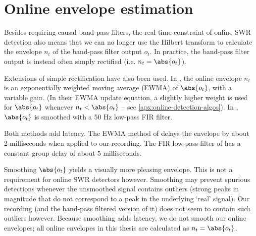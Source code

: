 



\section{Online envelope estimation}

Besides requiring causal band-pass filters, the real-time constraint of online SWR detection also means that we can no longer use the Hilbert transform to calculate the envelope $n_t$ of the band-pass filter output $o_t$. In practice, the band-pass filter output is instead often simply rectified (i.e. $n_t = \abs{o_t}$).

Extensions of simple rectification have also been used. In , the online envelope $n_t$ is an exponentially weighted moving average (EWMA) of $\abs{o_t}$, with a variable gain. (In their EWMA update equation, a slightly higher weight is used for $\abs{o_t}$  whenever $n_t < \abs{o_t}$ -- see \cref{apx:online-detection-algos}). In , $\abs{o_t}$ is smoothed with a 50 Hz low-pass FIR filter.

Both methods add latency. The EWMA method of \citeauthor*{Jadhav2012} delays the envelope by about 2 milliseconds when applied to our recording. The FIR low-pass filter of \citeauthor*{Dutta2018} has a constant group delay of about 5 milliseconds.

Smoothing $\abs{o_t}$ yields a visually more pleasing envelope. This is not a requirement for online SWR detectors however. Smoothing may prevent spurious detections whenever the unsmoothed signal contains outliers (strong peaks in magnitude that do not correspond to a peak in the underlying `real' signal). Our recording (and the band-pass filtered version of it) does not seem to contain such outliers however. Because smoothing adds latency, we do not smooth our online envelopes; all online envelopes in this thesis are calculated as $n_t = \abs{o_t}$.
